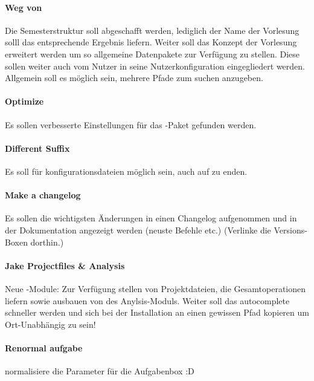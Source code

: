 \paragraph{Weg von }
Die Semesterstruktur soll abgeschafft werden, lediglich der Name der Vorlesung solll das entsprechende Ergebnis liefern. Weiter soll das Konzept der Vorlesung erweitert werden um so allgemeine Datenpakete zur Verfügung zu stellen. Diese sollen weiter auch vom Nutzer in seine Nutzerkonfiguration eingegliedert werden. Allgemein soll es möglich sein, mehrere Pfade zum suchen anzugeben.

\paragraph{Optimize }
Es sollen verbesserte Einstellungen für das -Paket gefunden werden.

\paragraph{Different Suffix}
Es soll für konfigurationsdateien möglich sein, auch auf  zu enden.

\paragraph{Make a changelog}
Es sollen die wichtigsten Änderungen in einen Changelog aufgenommen und in der Dokumentation angezeigt werden (neuste Befehle etc.) (Verlinke die Versions-Boxen dorthin.)

\paragraph{Jake Projectfiles \& Analysis}
Neue \Jake-Module: Zur Verfügung stellen von Projektdateien, die Gesamtoperationen liefern sowie ausbauen von des Anylsis-Moduls. Weiter soll das autocomplete schneller werden und sich \Jake bei der Installation an einen gewissen Pfad kopieren um Ort-Unabhängig zu sein!

\paragraph{Renormal aufgabe}
normalisiere die Parameter für die Aufgabenbox :D